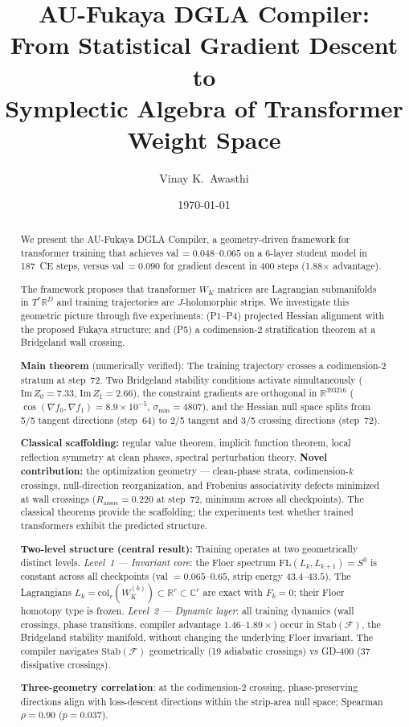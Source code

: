 \documentclass[11pt]{amsart}
\title{AU-Fukaya DGLA Compiler:\\
From Statistical Gradient Descent to\\
Symplectic Algebra of Transformer Weight Space}
\author{Vinay K.\ Awasthi}
\date{\today}
\begin{document}
\maketitle
\thispagestyle{plain}

\begin{abstract}
We present the AU-Fukaya DGLA Compiler, a geometry-driven framework for
transformer training that achieves val\,$= 0.048$--$0.065$ on a 6-layer
student model in 187~CE steps, versus val\,$= 0.090$ for gradient descent
in 400 steps (1.88$\times$ advantage).

The framework proposes that transformer $W_K$ matrices are Lagrangian
submanifolds in $T^*\mathbb{R}^D$ and training trajectories are
$J$-holomorphic strips.
We investigate this geometric picture through five experiments:
(P1--P4) projected Hessian alignment with the proposed Fukaya structure;
and (P5) a codimension-2 stratification theorem at a Bridgeland wall crossing.

\textbf{Main theorem} (numerically verified):
The training trajectory crosses a codimension-2 stratum at step~72.
Two Bridgeland stability conditions activate simultaneously
($\mathrm{Im}\,Z_0 = 7.33$, $\mathrm{Im}\,Z_1 = 2.66$),
the constraint gradients are orthogonal in $\mathbb{R}^{393216}$
($\cos(\nabla f_0, \nabla f_1) = 8.9\times10^{-5}$, $\sigma_\mathrm{min} = 4807$),
and the Hessian null space splits from 5/5 tangent directions (step~64)
to 2/5 tangent and 3/5 crossing directions (step~72).

\textbf{Classical scaffolding:} regular value theorem, implicit function theorem,
local reflection symmetry at clean phases, spectral perturbation theory.
\textbf{Novel contribution:} the optimization geometry ---
clean-phase strata, codimension-$k$ crossings, null-direction reorganization,
and Frobenius associativity defects minimized at wall crossings
($R_\mathrm{assoc} = 0.220$ at step~72, minimum across all checkpoints).
The classical theorems provide the scaffolding;
the experiments test whether trained transformers exhibit the predicted structure.

\textbf{Two-level structure (central result):}
Training operates at two geometrically distinct levels.
\emph{Level~1 --- Invariant core}: the Floer spectrum
$\mathrm{FL}(L_k, L_{k+1}) = S^0$ is constant across all checkpoints
(val $= 0.065$--$0.65$, strip energy $43.4$--$43.5$).
The Lagrangians $L_k = \mathrm{col}_r(W_K^{(k)}) \subset \mathbb{R}^r \subset \mathbb{C}^r$
are exact with $F_k = 0$; their Floer homotopy type is frozen.
\emph{Level~2 --- Dynamic layer}: all training dynamics
(wall crossings, phase transitions, compiler advantage $1.46$--$1.89\times$)
occur in $\mathrm{Stab}(\mathcal{F})$, the Bridgeland stability manifold,
without changing the underlying Floer invariant.
The compiler navigates $\mathrm{Stab}(\mathcal{F})$ geometrically
(19 adiabatic crossings) vs GD-400 (37 dissipative crossings).

\textbf{Three-geometry correlation}: at the codimension-2 crossing,
phase-preserving directions align with loss-descent directions
within the strip-area null space; Spearman $\rho = 0.90$ ($p = 0.037$).
\end{abstract}
\end{document}
